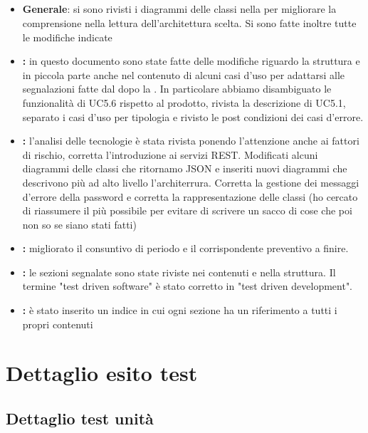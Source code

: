 \documentclass[12pt,a4paper]{article}
\begin{document}
	\subsection{\RP{}}
	\begin{itemize}
		\item \textbf{Generale}: si sono rivisti i diagrammi delle classi nella \DP  per migliorare la comprensione nella lettura dell'architettura scelta. Si sono fatte inoltre tutte le modifiche indicate
		\item \textbf{\AdR{}:} in questo documento sono state fatte delle modifiche  riguardo la struttura e in piccola parte anche nel contenuto di alcuni casi d'uso per adattarsi  alle segnalazioni fatte dal  dopo la \RP. In particolare abbiamo disambiguato le funzionalità di UC5.6 rispetto al prodotto, rivista la descrizione di UC5.1, separato i casi d'uso per tipologia e rivisto le post condizioni dei casi d'errore.
		\item \textbf{\DP{}:} l'analisi delle tecnologie è stata rivista ponendo l'attenzione anche ai fattori di rischio, corretta l'introduzione ai servizi REST. Modificati alcuni diagrammi delle classi che ritornamo JSON e inseriti nuovi diagrammi che descrivono più ad alto livello l'architerrura. Corretta la gestione dei messaggi d'errore della password e corretta la rappresentazione delle classi (ho cercato di riassumere il più possibile per evitare di scrivere un sacco di cose che poi non so se siano stati fatti)
	    \item \textbf{\PdP{}:} migliorato il consuntivo di periodo e il corrispondente preventivo a finire.
	    \item \textbf{\PdQ{}:} le sezioni segnalate sono state riviste nei contenuti e nella struttura. Il termine "test driven software" è stato corretto in "test driven development".
	    \item \textbf{\GL{}:} è stato inserito un indice in cui ogni sezione ha un riferimento a tutti i propri contenuti
	\end{itemize}
	
	\section{Dettaglio esito test}
	\subsection{Dettaglio test unità}
	
	
\end{document}
